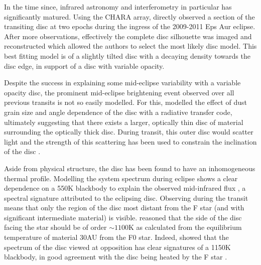 \documentclass[%
 reprint,
 amsmath,amssymb,
 aps,
rmp,
floatfix,
]{revtex4-2}
\begin{document}
In the time since, infrared astronomy and interferometry in particular has significantly matured. Using the CHARA array, \citet{Kloppenborg2010Natur} directly observed a section of the transiting disc at two epochs during the ingress of the 2009-2011 Eps Aur eclipse. After more observations, effectively the complete disc silhouette was imaged and reconstructed \citep[see top panel in Fig.~\ref{fig:eps-aur}]{Kloppenborg2015ApJS} which allowed the authors to select the most likely disc model. This best fitting model is of a slightly tilted disc with a decaying density towards the disc edge, in support of a disc with variable opacity. 

Despite the success in explaining some mid-eclipse variability with a variable opacity disc, the prominent mid-eclipse brightening event observed over all previous transits is not so easily modelled. For this, \citet{Budaj2011A&A} modelled the effect of dust grain size and angle dependence of the disc with a radiative transfer code, ultimately suggesting that there exists a larger, optically thin disc of material surrounding the optically thick disc. During transit, this outer disc would scatter light and the strength of this scattering has been used to constrain the inclination of the disc \citep{Muthumariappan2012MNRAS}.

Aside from physical structure, the disc has been found to have an inhomogeneous thermal profile. Modelling the system spectrum during eclipse shows a clear dependence on a 550K blackbody to explain the observed mid-infrared flux \citep[][bottom panel of Fig.~\ref{fig:eps-aur}]{Backman1984ApJ, Hoard2010ApJ}, a spectral signature attributed to the eclipsing disc. Observing during the transit means that only the region of the disc most distant from the F star (and with significant intermediate material) is visible. \citep{Backman1984ApJ} reasoned that the side of the disc facing the star should be of order $\sim 1100$K as calculated from the equilibrium temperature of material 30AU from the F0 star. Indeed, \citet{Hoard2012ApJ} showed that the spectrum of the disc viewed at opposition has clear signatures of a 1150K blackbody, in good agreement with the disc being heated by the F star \citep{Takeuchi2011PASJ, Pearson2015ApJ}. 
\end{document}
